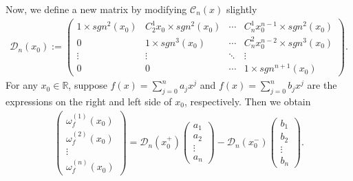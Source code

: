 \documentclass{article}
\begin{document}
Now, we define a new matrix by modifying $\mathcal{C}_{n}(x)$ slightly
\begin{eqnarray*}
    \mathcal{D}_{n}(x_{0}):=\left(\begin{matrix}
    1\times sgn^{2}(x_{0}) & C_{2}^{1}x_{0}\times sgn^{2}(x_{0}) & \cdots & C_{n}^{1}x_{0}^{n-1}\times sgn^{2}(x_{0}) \\ 
    0 & 1\times sgn^{3}(x_{0}) & \cdots & C_{n}^{2}x_{0}^{n-2}\times sgn^{3}(x_{0}) \\
    \vdots & \vdots & \ddots &\vdots\\
    0 & 0 & \cdots & 1\times sgn^{n+1}(x_{0})
    \end{matrix}\right).
\end{eqnarray*}
For any $x_{0}\in\mathbb{R}$, suppose $f(x)=\sum_{j=0}^{n}a_{j}x^{j}$ and $f(x)=\sum_{j=0}^{n}b_{j}x^{j}$ are the expressions on the right and left side of $x_{0}$, respectively. Then we obtain
\begin{eqnarray}\label{2a3}
     \left(\begin{matrix}\omega_{f}^{(1)}(x_{0}) \\ 
    \omega_{f}^{(2)}(x_{0})\\
    \vdots\\
    \omega_{f}^{(n)}(x_{0})
    \end{matrix}\right)
    =\mathcal{D}_{n}(x_{0}^{+})\left(\begin{matrix}a_{1} \\ 
    a_{2}\\
    \vdots\\
    a_{n}
    \end{matrix}\right)-\mathcal{D}_{n}(x_{0}^{-})\left(\begin{matrix}b_{1} \\ 
    b_{2}\\
    \vdots\\
    b_{n}
    \end{matrix}\right).
\end{eqnarray}
\end{document}
